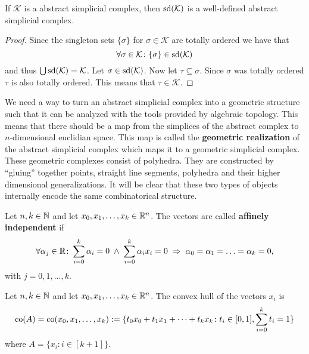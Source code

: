 \begin{thm}
    If $\mathcal{K}$ is a abstract simplicial complex, then ${\rm sd}(\mathcal{K})$ is a well-defined abstract simplicial complex.
\end{thm}

\begin{proof}
    Since the singleton sets $\{\sigma\}$ for $\sigma \in \mathcal{K}$ are totally ordered we have that \[\forall \sigma\in \mathcal{K}\colon \{\sigma\} \in {\rm sd}(\mathcal{K})\] and thus $\bigcup {\rm sd}(\mathcal{K}) = \mathcal{K}$. Let $\sigma \in {\rm sd}(\mathcal{K})$. Now let $\tau \subseteq \sigma$. Since $\sigma$ was totally ordered $\tau$ is also totally ordered.
    This means that $\tau \in \mathcal{K}$.
\end{proof}

We need a way to turn an abstract simplicial complex into a geometric structure such that it can be analyzed with the tools provided by algebraic topology. This means that there should be a map from the simplices of the abstract complex to $n$-dimensional euclidian space. This map is called the \textbf{geometric realization} of the abstract simplicial complex which maps it to a geometric simplicial complex. 
These geometric complexes consist of polyhedra. They are constructed by ``gluing'' 
together points, straight line segments, polyhedra and their higher dimensional generalizations.
It will be clear that these two types of objects internally encode the same combinatorical structure. 

\begin{defin}
    Let $n,k \in \mathbb{N}$ and let $x_0, x_1, \ldots, x_k \in \mathbb{R}^n$. 
    The vectors are called \textbf{affinely independent} if
    \begin{equation*}
        \forall \alpha_j\in \mathbb{R}\colon \sum\limits_{i=0}^k \alpha_i = 0 \; \land \; \sum\limits_{i=0}^k \alpha_i x_i = 0 \; \Rightarrow \; \alpha_0 = \alpha_1 = \ldots = \alpha_k = 0, 
    \end{equation*} with $j = 0, 1, \ldots, k$.
\end{defin}

\begin{defin}
    Let $n,k \in \mathbb{N}$ and let $x_0, x_1, \ldots, x_k \in \mathbb{R}^n$. The convex hull of the vectors $x_i$ is
    \begin{equation*}
        {\rm co} (A) = {\rm co}(x_0, x_1, \ldots, x_k) := \{ t_0 x_0 + t_1 x_1 + \cdots + t_k x_k \colon t_i \in [0, 1], \sum\limits_{i=0}^k t_i = 1\}
    \end{equation*}
    where $A = \{x_i\colon i \in [k+1]\}$.  
\end{defin}

